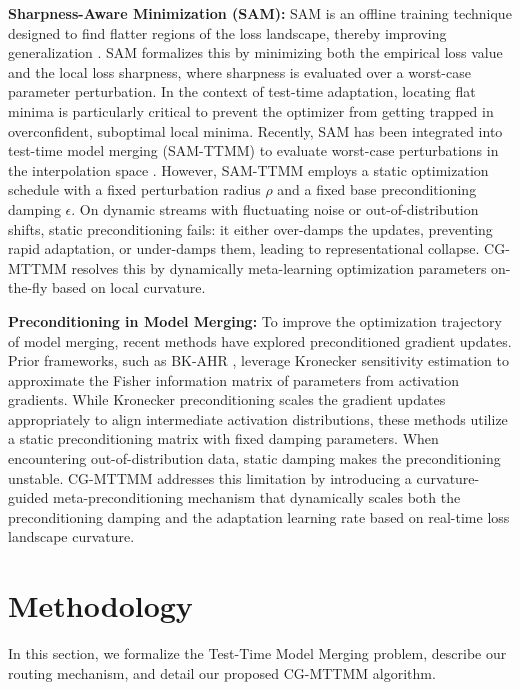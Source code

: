 \documentclass{article}
\theoremstyle{plain}
\theoremstyle{definition}
\theoremstyle{remark}
\begin{document}
\textbf{Sharpness-Aware Minimization (SAM):} SAM is an offline training technique designed to find flatter regions of the loss landscape, thereby improving generalization \cite{foret2020sharpness}. SAM formalizes this by minimizing both the empirical loss value and the local loss sharpness, where sharpness is evaluated over a worst-case parameter perturbation. In the context of test-time adaptation, locating flat minima is particularly critical to prevent the optimizer from getting trapped in overconfident, suboptimal local minima. Recently, SAM has been integrated into test-time model merging (SAM-TTMM) to evaluate worst-case perturbations in the interpolation space \cite{sam_ttmm}. However, SAM-TTMM employs a static optimization schedule with a fixed perturbation radius $\rho$ and a fixed base preconditioning damping $\epsilon$. On dynamic streams with fluctuating noise or out-of-distribution shifts, static preconditioning fails: it either over-damps the updates, preventing rapid adaptation, or under-damps them, leading to representational collapse. CG-MTTMM resolves this by dynamically meta-learning optimization parameters on-the-fly based on local curvature.

\textbf{Preconditioning in Model Merging:} To improve the optimization trajectory of model merging, recent methods have explored preconditioned gradient updates. Prior frameworks, such as BK-AHR \cite{bk_ahr}, leverage Kronecker sensitivity estimation to approximate the Fisher information matrix of parameters from activation gradients. While Kronecker preconditioning scales the gradient updates appropriately to align intermediate activation distributions, these methods utilize a static preconditioning matrix with fixed damping parameters. When encountering out-of-distribution data, static damping makes the preconditioning unstable. CG-MTTMM addresses this limitation by introducing a curvature-guided meta-preconditioning mechanism that dynamically scales both the preconditioning damping and the adaptation learning rate based on real-time loss landscape curvature.

\section{Methodology}
\label{sec:method}
In this section, we formalize the Test-Time Model Merging problem, describe our routing mechanism, and detail our proposed CG-MTTMM algorithm.
\end{document}
